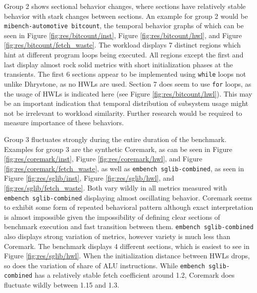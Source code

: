 \documentclass[../bachelor_paper.tex]{subfiles}
\begin{document}
Group 2 shows sectional behavior changes, where sections have relatively stable behavior with stark changes between sections. An example for group 2 would be \texttt{mibench-automotive bitcount}, the temporal behavior graphs of which can be seen in Figure \ref{fig:res/bitcount/inst}, Figure \ref{fig:res/bitcount/hwl}, and Figure \ref{fig:res/bitcount/fetch_waste}. The workload displays 7 distinct regions which hint at different program loops being executed. All regions except the first and last display almost rock solid metrics with short initialization phases at the transients. The first 6 sections appear to be implemented using \texttt{while} loops not unlike Dhrystone, as no \acp{HWL} are used. Section 7 does seem to use \texttt{for} loops, as the usage of \acp{HWL} is indicated here (see Figure \ref{fig:res/bitcount/hwl}). This may be an important indication that temporal distribution of subsystem usage might not be irrelevant to workload similarity. Further research would be required to measure importance of these behaviors.

Group 3 fluctuates strongly during the entire duration of the benchmark. Examples for group 3 are the synthetic Coremark, as can be seen in Figure \ref{fig:res/coremark/inst}, Figure \ref{fig:res/coremark/hwl}, and Figure \ref{fig:res/coremark/fetch_waste}, as well as \texttt{embench sglib-combined}, as seen in Figure \ref{fig:res/sglib/inst}, Figure \ref{fig:res/sglib/hwl}, and \ref{fig:res/sglib/fetch_waste}. Both vary wildly in all metrics measured with \texttt{embench sglib-combined} displaying almost oscillating behavior. Coremark seems to exhibit some form of repeated behavioral pattern although exact interpretation is almost impossible given the impossibility of defining clear sections of benchmark execution and fast transition between them. \texttt{embench sglib-combined} also displays strong variation of metrics, however variety is much less than Coremark. The benchmark displays 4 different sections, which is easiest to see in Figure \ref{fig:res/sglib/hwl}. When the initialization distance between \acp{HWL} drops, so does the variation of share of \ac{ALU} instructions. While \texttt{embench sglib-combined} has a relatively stable fetch coefficient around 1.2, Coremark does fluctuate wildly between 1.15 and 1.3.
\end{document}
